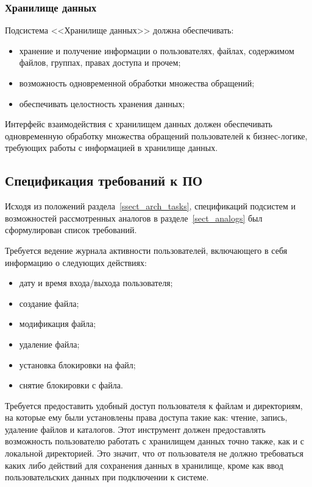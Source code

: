 \documentclass[utf8,usehyperref,12pt]{G7-32}
\begin{document}
\subsubsection{Хранилище данных}

Подсистема <<Хранилище данных>> должна обеспечивать:

\begin{itemize}
 \item хранение и получение информации о пользователях, файлах, содержимом файлов, группах, правах доступа и прочем;
 \item возможность одновременной обработки множества обращений;
 \item обеспечивать целостность хранения данных;
\end{itemize}

Интерфейс взаимодействия с хранилищем данных должен обеспечивать одновременную обработку множества обращений пользователей к бизнес-логике, требующих работы с информацией в хранилище данных.

\subsection{Спецификация требований к ПО}\label{ssect_soft_req}
Исходя из положений раздела~\ref{ssect_arch_tasks}, спецификаций подсистем и возможностей рассмотренных аналогов в разделе~\ref{sect_analogs} был сформулирован список требований.

Требуется ведение журнала активности пользователей, включающего в себя информацию о следующих действиях: 
\begin{itemize}
\item дату и время входа/выхода пользователя;
\item создание файла;
\item модификация файла;
\item удаление файла;
\item установка блокировки на файл;
\item снятие блокировки с файла.
\end{itemize}

Требуется предоставить удобный доступ пользователя к файлам и директориям, на которые ему были установлены права доступа такие как: чтение, запись, удаление файлов и каталогов. Этот инструмент должен предоставлять возможность пользователю работать с хранилищем данных точно также, как и с локальной директорией. Это значит, что от пользователя не должно требоваться каких либо действий для сохранения данных в хранилище, кроме как ввод пользовательских данных при подключении к системе.
\end{document}
